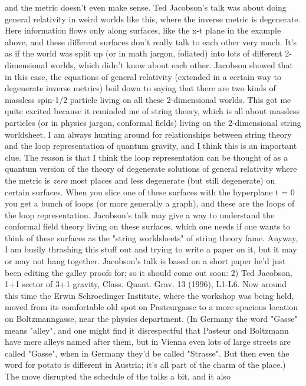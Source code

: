 and the metric doesn't even make sense.
Ted Jacobson's talk was about doing general relativity in weird
worlds like this, where the inverse metric is degenerate.  Here
information flows only along surfaces, like the x-t plane in the
example above, and these different surfaces don't really talk to
each other very much.  It's as if the world was split up (or in
math jargon, foliated) into lots of different 2-dimensional
worlds, which didn't know about each other.  Jacobson showed that
in this case, the equations of general relativity (extended in a
certain way to degenerate inverse metrics) boil down to saying
that there are two kinds of massless spin-1/2 particle living on
all these 2-dimensional worlds.  
This got me quite excited because it reminded me of string
theory, which is all about massless particles (or in physics
jargon, conformal fields) living on the 2-dimensional string
worldsheet.   I am always hunting around for relationships
between string theory and the loop representation of quantum
gravity, and I think this is an important clue.  The reason is
that I think the loop representation can be thought of as a
quantum version of the theory of degenerate solutions of general
relativity where the metric is \emph{zero} most places and less
degenerate (but still degenerate) on certain surfaces.   When you
slice one of these surfaces with the hyperplane t = 0 you get a
bunch of loops (or more generally a graph), and these are the
loops of the loop representation.  Jacobson's talk may give a way
to understand the conformal field theory living on these
surfaces, which one needs if one wants to think of these surfaces
as the "string worldsheets" of string theory fame.  Anyway, I am
busily thrashing this stuff out and trying to write a paper on
it, but it may or may not hang together.
Jacobson's talk is based on a short paper he'd just been editing
the galley proofs for; so it should come out soon: 
2) Ted Jacobson, 1+1 sector of 3+1 gravity, Class. Quant. Grav.
13 (1996), L1-L6.
Now around this time the Erwin Schroedinger Institute, where the
workshop was being held, moved from its comfortable old spot on
Pasteurgasse to a more spacious location on Boltzmanngasse, near
the physics department.  (In Germany the word "Gasse" means
"alley", and one might find it disrespectful that Pasteur and
Boltzmann have mere alleys named after them, but in Vienna even
lots of large streets are called "Gasse", when in Germany they'd
be called "Strasse".  But then even the word for potato is
different in Austria; it's all part of the charm of the place.)  
The move disrupted the schedule of the talks a bit, and it also
